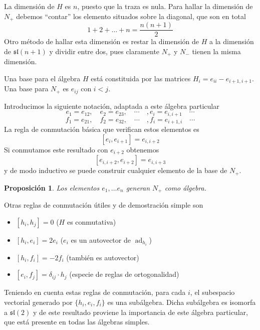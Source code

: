 \documentclass[a4paper,draft,12pt]{scrartcl}
\newtheorem{propo}[teo]{Proposición}%
\DeclareMathOperator{\ad}{ad}  %
\begin{document}
La dimensión de $H$ es $n$, puesto que la traza es nula.  Para hallar la dimensión de $N_+$ debemos ``contar'' los elemento situados sobre la diagonal, que son en total
$$
1+2+ \dots+ n= \frac{n(n+1)}{2}
$$
Otro método de hallar esta dimensión es restar la dimensión de $H$ a la dimensión de $\mathfrak{sl}(n+1)$ y dividir entre dos, pues claramente $N_+$ y $N_-$ tienen la misma dimensión.

\bigskip

Una base para el álgebra $H$ está constituida por las matrices $H_i= e_{ii}-e_{i+1,i+1}$.  Una base para $N_+$ es $e_{ij}$ con $i<j$.

Introducimos la siguiente notación, adaptada a este álgebra particular
$$
e_1 =e_{12}, \quad e_2= e_{23}, \quad  \cdots\quad, e_i = e_{i,i+1}\quad \cdots
$$
$$
f_1 =e_{21}, \quad f_2= e_{32}, \quad  \cdots\quad, f_i = e_{i+1,i}\quad \cdots
$$
La regla de conmutación básica que verifican estos elementos es
$$
[e_i,e_{i+1}]= e_{i,i+2}
$$
Si conmutamos este resultado con $e_{i+2}$ obtenemos
$$
[e_{i,i+2},e_{i+2}]= e_{i,i+3}
$$
y de modo inductivo se puede construir cualquier elemento de la base de $N_+$.

\begin{propo}

Los elementos $e_1, \dots e_n$ generan $N_+$ como álgebra.

\end{propo}

Otras reglas de conmutación útiles y de demostración simple son

\begin{itemize}

\item $[h_i,h_j]=0$ ($H$ es conmutativa)

\item $[h_i,e_i]= 2e_i$ ($e_i$ es un autovector de $ \ad_{h_i}$)

\item $[h_i, f_i]= -2f_i$ (también es autovector)

\item $[e_i,f_j]= \delta_{ij} \cdot h_j$ (especie de reglas de ortogonalidad) 

\end{itemize}


Teniendo en cuenta estas reglas de conmutación, para cada $i$, el subespacio vectorial generado por $\{h_i,e_i,f_i\}$ es una subálgebra.  Dicha subálgebra es isomorfa a $\mathfrak{sl}(2) $ y de este resultado proviene la importancia de este álgebra particular, que está presente en todas las álgebras simples.
\end{document}
